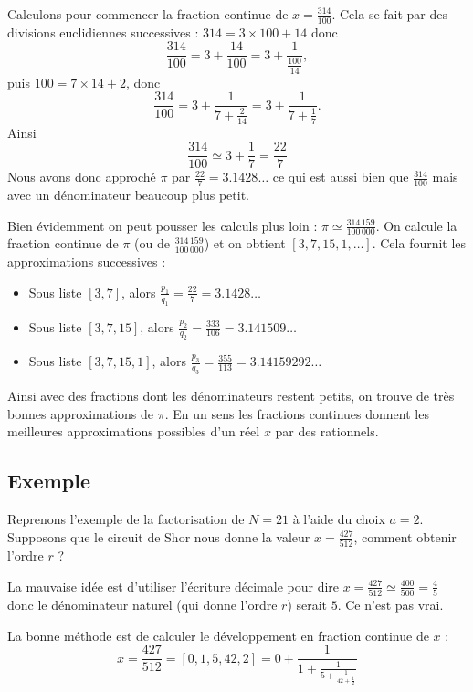 \documentclass[11pt,class=report,crop=false]{standalone}
\begin{document}
Calculons pour commencer la fraction continue de $x = \frac{314}{100}$.
Cela se fait par des divisions euclidiennes successives :
$314 = 3 \times 100 + 14$ donc
$$\frac{314}{100} = 3 + \frac{14}{100} = 3 + \frac{1}{\frac{100}{14}},$$
puis $100 = 7 \times 14 + 2$, donc  
$$\frac{314}{100} = 3 + \frac{1}{7+\frac{2}{14}} = 3 + \frac{1}{7+\frac{1}{7}}.$$
Ainsi $$\frac{314}{100} \simeq 3 + \frac{1}{7} = \frac{22}{7}$$
Nous avons donc approché $\pi$ par $\frac{22}{7} = 3.1428\ldots$ ce qui est aussi bien que $\frac{314}{100}$ mais avec un dénominateur beaucoup plus petit.

Bien évidemment on peut pousser les calculs plus loin :
$\pi \simeq \frac{314\,159}{100\,000}$.
On calcule la fraction continue de $\pi$ (ou de $\frac{314\,159}{100\,000}$) et on obtient $[3, 7, 15, 1,\ldots]$. Cela fournit les approximations successives :
\begin{itemize}
  \item Sous liste $[3,7]$, alors $\frac{p_1}{q_1} = \frac{22}{7}= 3.1428\ldots$
  \item Sous liste $[3,7,15]$, alors $\frac{p_2}{q_2} = \frac{333}{106}= 3.141509\ldots$
  \item Sous liste $[3,7,15,1]$, alors $\frac{p_3}{q_3} = \frac{355}{113}= 3.14159292\ldots$
\end{itemize}

Ainsi avec des fractions dont les dénominateurs restent petits, on trouve de très bonnes approximations de $\pi$.
En un sens les fractions continues donnent les meilleures approximations possibles d'un réel $x$ par des rationnels.

\subsection{Exemple}

Reprenons l'exemple de la factorisation de $N=21$ à l'aide du choix $a=2$.
Supposons que le circuit de Shor nous donne la valeur $x = \frac{427}{512}$,
comment obtenir l'ordre $r$ ?

La mauvaise idée est d'utiliser l'écriture décimale pour dire $x = \frac{427}{512} \simeq \frac{400}{500} = \frac45$ donc le dénominateur naturel (qui donne l'ordre $r$) serait $5$. Ce n'est pas vrai.

La bonne méthode est de calculer le développement en fraction continue de $x$ :
$$
x 
= \frac{427}{512} 
= [0,1,5,42,2] 
= 0 + \frac{1}{1 + \frac{1}{5 + \frac{1}{42 + \frac12}}}
$$
\end{document}
